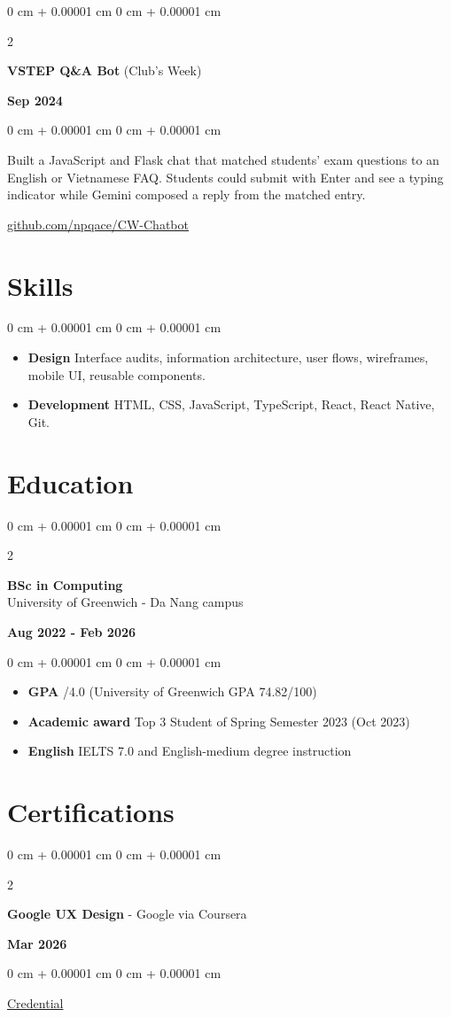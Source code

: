 \documentclass[11pt, letterpaper]{article}
\newenvironment{highlights}{
    \begin{itemize}[
        topsep=0.05 cm,  
        parsep=0.05 cm,  
        partopsep=0pt,
        itemsep=0pt,
        leftmargin=0 cm + 10pt
    ]
}{
    \end{itemize}
}
\newenvironment{onecolentry}{
    \begin{adjustwidth}{
        0 cm + 0.00001 cm
    }{
        0 cm + 0.00001 cm
    }
}{
    \end{adjustwidth}
}
\newenvironment{twocolentry}[2][]{
    \onecolentry
    \def\secondColumn{#2}
    \setcolumnwidth{\fill, 4.5 cm}
    \begin{paracol}{2}
}{
    \switchcolumn \raggedleft \secondColumn
    \end{paracol}
    \endonecolentry
}
\begin{document}
    \vspace{0.20 cm}

    \begin{twocolentry}{\textbf{Sep 2024}}
        \textbf{VSTEP Q\&A Bot} (Club's Week)
    \end{twocolentry}
    \begin{onecolentry}
        Built a JavaScript and Flask chat that matched students' exam questions to an English or Vietnamese FAQ. Students could submit with Enter and see a typing indicator while Gemini composed a reply from the matched entry.\par
        \href{https://github.com/npqace/CW-Chatbot}{github.com/npqace/CW-Chatbot}
    \end{onecolentry}

    \section{Skills}
    \begin{onecolentry}
        \begin{highlights}
            \item \textbf{Design} \enspace Interface audits, information architecture, user flows, wireframes, mobile UI, reusable components.
            \item \textbf{Development} \enspace HTML, CSS, JavaScript, TypeScript, React, React Native, Git.
        \end{highlights}
    \end{onecolentry}

    \section{Education}
    \begin{twocolentry}{\textbf{Aug 2022 - Feb 2026}}
        \textbf{BSc in Computing} \\
        University of Greenwich - Da Nang campus
    \end{twocolentry}
    \begin{onecolentry}
        \begin{highlights}
            \item \textbf{GPA} /4.0 (University of Greenwich GPA 74.82/100)
            \item \textbf{Academic award} \enspace Top 3 Student of Spring Semester 2023 (Oct 2023)
            \item \textbf{English} \enspace IELTS 7.0 and English-medium degree instruction
        \end{highlights}
    \end{onecolentry}

    \section{Certifications}
    \begin{twocolentry}{\textbf{Mar 2026}}
        \textbf{Google UX Design} - Google via Coursera
    \end{twocolentry}
    \begin{onecolentry}
        \href{https://coursera.org/share/84663e4ba7c925ee474db831edb788ce}{Credential}
    \end{onecolentry}
\end{document}

